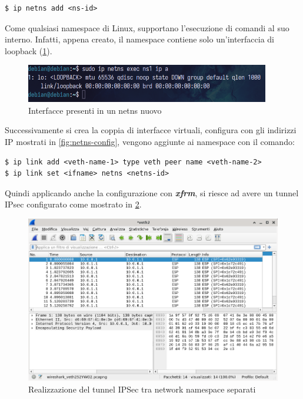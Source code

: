 \documentclass{article}
\begin{document}
\begin{verbatim}
$ ip netns add <ns-id> 
\end{verbatim}

Come qualsiasi namespace di Linux, supportano l'esecuzione di comandi al suo interno. Infatti, 
appena creato, il namespace contiene solo un'interfaccia di loopback (\cref{fig:netns-exec-iface}).

\begin{figure}[h]
  \begin{center}
    \includegraphics[width=0.95\textwidth]{figures/netns-exec-iface.png}
  \end{center}
  \caption{Interfacce presenti in un netns nuovo}\label{fig:netns-exec-iface}
\end{figure}

Successivamente si crea la coppia di interfacce virtuali, configura con gli indirizzi IP 
mostrati in \cref{fig:netns-config}, vengono
aggiunte ai namespace con il comando:

\begin{verbatim}
$ ip link add <veth-name-1> type veth peer name <veth-name-2>
$ ip link set <ifname> netns <netns-id>
\end{verbatim}

Quindi applicando anche la configurazione con \textbf{\textit{xfrm}}, si riesce ad avere 
un tunnel IPsec configurato come mostrato in \cref{fig:netns-esp}. 

\begin{figure}[h]
  \begin{center}
    \includegraphics[width=.8\textwidth]{figures/netns-esp.png}
  \end{center}
  \caption{Realizzazione del tunnel IPSec tra network namespace separati}\label{fig:netns-esp}
\end{figure}
\end{document}
